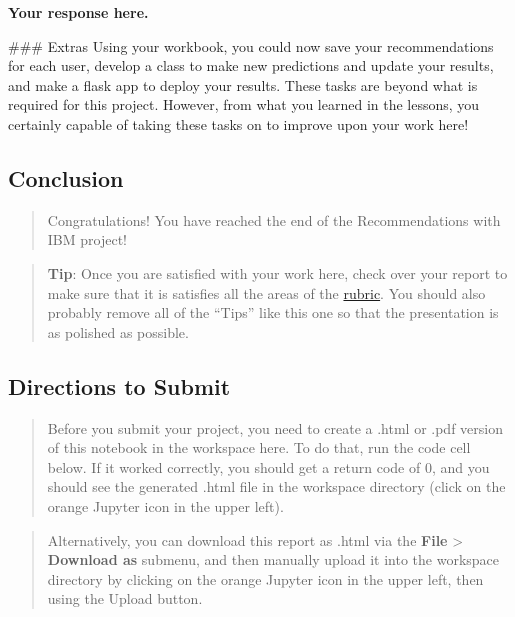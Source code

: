 \documentclass[11pt]{article}
\begin{document}
    \textbf{Your response here.}

     \#\#\# Extras Using your workbook, you could now save your
recommendations for each user, develop a class to make new predictions
and update your results, and make a flask app to deploy your results.
These tasks are beyond what is required for this project. However, from
what you learned in the lessons, you certainly capable of taking these
tasks on to improve upon your work here!

\hypertarget{conclusion}{%
\subsection{Conclusion}\label{conclusion}}

\begin{quote}
Congratulations! You have reached the end of the Recommendations with
IBM project!
\end{quote}

\begin{quote}
\textbf{Tip}: Once you are satisfied with your work here, check over
your report to make sure that it is satisfies all the areas of the
\href{https://review.udacity.com/\#!/rubrics/2322/view}{rubric}. You
should also probably remove all of the ``Tips'' like this one so that
the presentation is as polished as possible.
\end{quote}

\hypertarget{directions-to-submit}{%
\subsection{Directions to Submit}\label{directions-to-submit}}

\begin{quote}
Before you submit your project, you need to create a .html or .pdf
version of this notebook in the workspace here. To do that, run the code
cell below. If it worked correctly, you should get a return code of 0,
and you should see the generated .html file in the workspace directory
(click on the orange Jupyter icon in the upper left).
\end{quote}

\begin{quote}
Alternatively, you can download this report as .html via the
\textbf{File} \textgreater{} \textbf{Download as} submenu, and then
manually upload it into the workspace directory by clicking on the
orange Jupyter icon in the upper left, then using the Upload button.
\end{quote}
\end{document}
